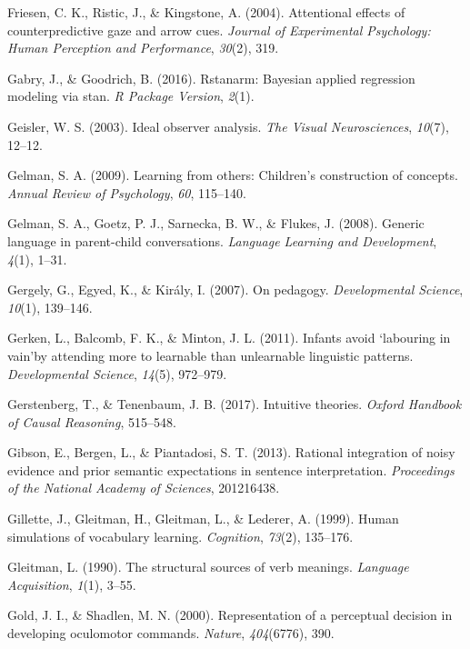 \documentclass[oneside]{report}
\begin{document}
\hypertarget{ref-friesen2004attentional}{}
Friesen, C. K., Ristic, J., \& Kingstone, A. (2004). Attentional effects
of counterpredictive gaze and arrow cues. \emph{Journal of Experimental
Psychology: Human Perception and Performance}, \emph{30}(2), 319.

\hypertarget{ref-gabry2016rstanarm}{}
Gabry, J., \& Goodrich, B. (2016). Rstanarm: Bayesian applied regression
modeling via stan. \emph{R Package Version}, \emph{2}(1).

\hypertarget{ref-geisler2003ideal}{}
Geisler, W. S. (2003). Ideal observer analysis. \emph{The Visual
Neurosciences}, \emph{10}(7), 12--12.

\hypertarget{ref-gelman2009learning}{}
Gelman, S. A. (2009). Learning from others: Children's construction of
concepts. \emph{Annual Review of Psychology}, \emph{60}, 115--140.

\hypertarget{ref-gelman2008generic}{}
Gelman, S. A., Goetz, P. J., Sarnecka, B. W., \& Flukes, J. (2008).
Generic language in parent-child conversations. \emph{Language Learning
and Development}, \emph{4}(1), 1--31.

\hypertarget{ref-gergely2007pedagogy}{}
Gergely, G., Egyed, K., \& Király, I. (2007). On pedagogy.
\emph{Developmental Science}, \emph{10}(1), 139--146.

\hypertarget{ref-gerken2011infants}{}
Gerken, L., Balcomb, F. K., \& Minton, J. L. (2011). Infants avoid
`labouring in vain'by attending more to learnable than unlearnable
linguistic patterns. \emph{Developmental Science}, \emph{14}(5),
972--979.

\hypertarget{ref-gerstenberg2017intuitive}{}
Gerstenberg, T., \& Tenenbaum, J. B. (2017). Intuitive theories.
\emph{Oxford Handbook of Causal Reasoning}, 515--548.

\hypertarget{ref-gibson2013rational}{}
Gibson, E., Bergen, L., \& Piantadosi, S. T. (2013). Rational
integration of noisy evidence and prior semantic expectations in
sentence interpretation. \emph{Proceedings of the National Academy of
Sciences}, 201216438.

\hypertarget{ref-gillette1999human}{}
Gillette, J., Gleitman, H., Gleitman, L., \& Lederer, A. (1999). Human
simulations of vocabulary learning. \emph{Cognition}, \emph{73}(2),
135--176.

\hypertarget{ref-gleitman1990structural}{}
Gleitman, L. (1990). The structural sources of verb meanings.
\emph{Language Acquisition}, \emph{1}(1), 3--55.

\hypertarget{ref-gold2000representation}{}
Gold, J. I., \& Shadlen, M. N. (2000). Representation of a perceptual
decision in developing oculomotor commands. \emph{Nature},
\emph{404}(6776), 390.
\end{document}
